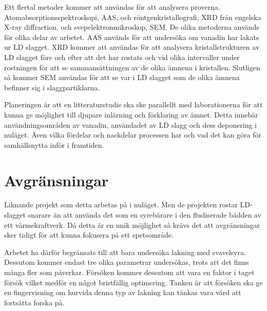 \documentclass{article}
\begin{document}
 Ett flertal metoder kommer att användas för att analysera proverna. Atomabsorptionsspektroskopi, AAS, och röntgenkristallografi, XRD från engelska X-ray diffraction, och svepelektronmikroskop, SEM. De olika metoderna används för olika delar av arbetet. AAS används för att undersöka om vanadin har lakats ur LD slagget. XRD kommer att användas för att analysera kristallstrukturen av LD slagget före och efter att det har rostats och vid olika intervaller under rostningen för att se sammansättningen av de olika ämnena i kristallen. Slutligen så kommer SEM användas för att se var i LD slagget som de olika ämnena befinner sig i slaggpartiklarna. 

Planeringen är att en litteraturstudie ska ske parallellt med laborationerna för att kunna ge möjlighet till djupare inlärning och förklaring av ämnet. Detta innebär användningsområden av vanadin, användadet av LD slagg och dess deponering i nuläget. Även vilka fördelar och nackdelar processen har och vad det kan göra för samhällsnytta inför i framtiden. 

\section{Avgränsningar}


Liknande projekt som detta arbetas på i nuläget. Men de projekten rostar LD-slagget snarare än att använda det som en syrebärare i den fludiserade bädden av ett värmekraftverk. Då detta är en unik möjlighet så krävs det att avgränsningar sker tidigt för att kunna fokusera på ett spetsområde.  

Arbetet ha därför begränsats till att bara undersöka lakning med svavelsyra. Dessutom kommer endast tre olika parametrar undersökas, trots att det finns många fler som påverkar. Försöken kommer dessutom att vara en faktor i taget försök vilket medför en något bristfällig optimering. Tanken är att försöken ska ge en fingervisning om hurvida denna typ av lakning kan tänkas vara värd att fortsätta forska på.

\end{document}
